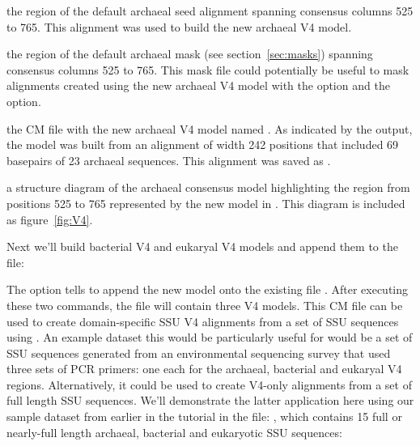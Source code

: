\begin{sreitems}{}

\item[\prog{archaea-0p1-sb.525-765.stk}] the region of the default
  archaeal seed alignment spanning consensus columns 525 to
  765. This alignment was used to build the new archaeal V4 model.
  
\item[\prog{archaea-0p1-sb.525-765.mask}] the region of the default
  archaeal mask (see section~\ref{sec:masks}) spanning consensus
  columns 525 to 765. This mask file could potentially be useful to mask
  alignments created using the new archaeal V4 model with the
   option and the  option.
  
\item[\prog{V4.cm}] the CM file with the new archaeal V4 model named
  . As indicated by the output, the model was built
  from an alignment of width 242 positions that included 69
  basepairs of 23 archaeal sequences. This alignment was saved as
  .
  
\item[\prog{archaea-0p1-sb.525-765.ps}] a structure diagram 
  of the archaeal consensus model highlighting the region from
  positions 525 to 765 represented by the new model in .
  This diagram is included as figure~\ref{fig:V4}.
\end{sreitems}

Next we'll build bacterial V4 and eukaryal V4 models and append them
to the  file:



The  option tells  to append the new model
onto the existing file .
After executing these two commands, the  file will contain
three V4 models. This CM file can be used to create domain-specific
SSU V4 alignments from a set of SSU sequences using
. An example dataset this would be particularly useful
for would be a set of SSU sequences generated from an environmental
sequencing survey that used three sets of PCR primers: one each for
the archaeal, bacterial and eukaryal V4 regions. Alternatively, it
could be used to create V4-only alignments from a set of full length
SSU sequences. We'll demonstrate the latter application here using our
sample dataset from earlier in the tutorial in the file:
, which contains 15 full or nearly-full
length archaeal, bacterial and eukaryotic SSU sequences:

